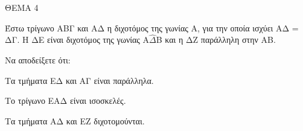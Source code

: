 
ΘΕΜΑ 4

Έστω τρίγωνο ΑΒΓ και ΑΔ η διχοτόμος της γωνίας Α, για την οποία ισχύει ΑΔ = ΔΓ. Η ΔΕ είναι διχοτόμος της γωνίας Α$\widehat{\Delta}$Β και η ΔΖ παράλληλη στην ΑΒ.

Να αποδείξετε ότι:

\begin{alist}
\item Τα τμήματα ΕΔ και ΑΓ είναι παράλληλα. 

\item Το τρίγωνο ΕΑΔ είναι ισοσκελές. 

\item Τα τμήματα ΑΔ και ΕΖ διχοτομούνται. 


\end{alist}
